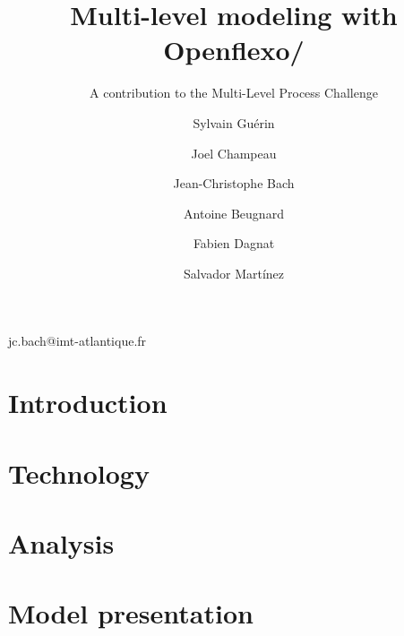 \documentclass[american]{emisa}
\newcommand{\mpc}{MULTI process challenge\xspace}%
\newcommand{\mlpc}{Multi-Level Process Challenge\xspace}
\begin{document}
\begin{article}{
    \title{Multi-level modeling with Openflexo/\FML}
    \subtitle{A contribution to the \mlpc} %

    \author{Sylvain Guérin}%
    \address{ENSTA Bretagne, Lab-STICC, UMR 6285, Brest, France}

    \author{Joel Champeau}
    \address[a]{}

    \author*{Jean-Christophe Bach}{jc.bach@imt-atlantique.fr}
    \address{IMT Atlantique, Lab-STICC, UMR 6285, Brest, France}

    \author{Antoine Beugnard}
    \address[b]{}

    \author{Fabien Dagnat}
    \address[b]{}

    \author{Salvador Mart\'inez}
    \address[b]{}

    \abstract{}
    
}

\section{Introduction}
\label{sec:introduction}



\section{Technology}
\label{sec:technology}


\section{Analysis}
\label{sec:analysis}


\section{Model presentation}
\label{sec:model}



\end{article}
\end{document}
